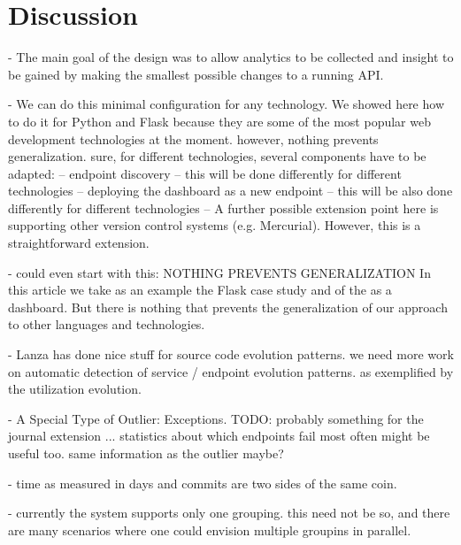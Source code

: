 
\section{Discussion}



- The main goal of the \tool design was to allow analytics to be collected and insight to be gained by making the smallest possible changes to a running API. %

- We can do this minimal configuration for any technology. We showed here how to do it for Python and Flask because they are some of the most popular web development technologies at the moment. however, nothing prevents generalization. sure, for different technologies, several components have to be adapted: 
-- endpoint discovery -- this will be done differently for different technologies
-- deploying the dashboard as a new endpoint -- this will be also done differently for different technologies 
--   A further possible extension point here is supporting other version control systems (e.g. Mercurial). However, this is a straightforward extension.


- could even start with this: NOTHING PREVENTS GENERALIZATION
In this article we take as an example the Flask case study
and of the \tool as a dashboard. 
But there is nothing that prevents the generalization of 
our approach to other languages and technologies.


- Lanza has done nice stuff for source code evolution patterns. we need more work on automatic detection of service / endpoint evolution patterns. as exemplified by the utilization evolution.



- A Special Type of Outlier: Exceptions. TODO: probably something for the journal extension ...
  statistics about which endpoints fail most often might be useful too.
  same information as the outlier maybe?

- time as measured in days and commits are two sides of the same coin. 

- currently the system supports only one grouping. this need not be so, and there are many scenarios where one could envision multiple groupins in parallel.

